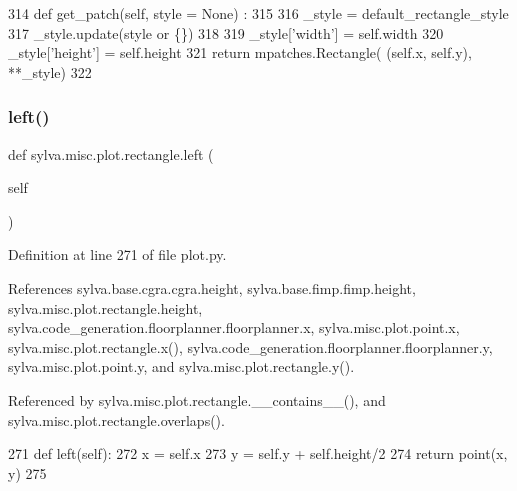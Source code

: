 \begin{DoxyCode}
314     \textcolor{keyword}{def }get\_patch(self, style = None) :
315 
316       \_style = default\_rectangle\_style
317       \_style.update(style \textcolor{keywordflow}{or} \{\})
318 
319       \_style[\textcolor{stringliteral}{'width'}] = self.width
320       \_style[\textcolor{stringliteral}{'height'}] = self.height
321       \textcolor{keywordflow}{return} mpatches.Rectangle( (self.x, self.y), **\_style)
322 
\end{DoxyCode}
\mbox{\label{classsylva_1_1misc_1_1plot_1_1rectangle_a4080bf5f63cc48132e480b458369af41}} 
\subsubsection{\texorpdfstring{left()}{left()}}
{\footnotesize\ttfamily def sylva.\+misc.\+plot.\+rectangle.\+left (\begin{DoxyParamCaption}\item[{}]{self }\end{DoxyParamCaption})}



Definition at line 271 of file plot.\+py.



References sylva.\+base.\+cgra.\+cgra.\+height, sylva.\+base.\+fimp.\+fimp.\+height, sylva.\+misc.\+plot.\+rectangle.\+height, sylva.\+code\+\_\+generation.\+floorplanner.\+floorplanner.\+x, sylva.\+misc.\+plot.\+point.\+x, sylva.\+misc.\+plot.\+rectangle.\+x(), sylva.\+code\+\_\+generation.\+floorplanner.\+floorplanner.\+y, sylva.\+misc.\+plot.\+point.\+y, and sylva.\+misc.\+plot.\+rectangle.\+y().



Referenced by sylva.\+misc.\+plot.\+rectangle.\+\_\+\+\_\+contains\+\_\+\+\_\+(), and sylva.\+misc.\+plot.\+rectangle.\+overlaps().


\begin{DoxyCode}
271     \textcolor{keyword}{def }left(self):
272       x = self.x
273       y = self.y + self.height/2
274       \textcolor{keywordflow}{return} point(x, y)
275 
\end{DoxyCode}
\mbox{\label{classsylva_1_1misc_1_1plot_1_1rectangle_a95db845fde73592eef007ab940b8b140}} 
